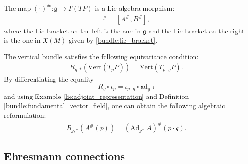 
    \begin{property}
        The map $(\cdot)^\#:\mathfrak{g}\rightarrow\Gamma(TP)$ is a Lie algebra morphism:
        \begin{gather}
            [A,B]^\# = [A^\#,B^\#],
        \end{gather}
        where the Lie bracket on the left is the one in $\mathfrak{g}$ and the Lie bracket on the right is the one in $\mathfrak{X}(M)$ given by \eqref{bundle:lie_bracket}.
    \end{property}

    \begin{property}
        The vertical bundle satisfies the following equivariance condition:
        \begin{gather}
            \label{bundle:vert_g_equivariance}
            R_{g,\ast}(\mathrm{Vert}(T_pP)) = \mathrm{Vert}(T_{p\cdot g}P).
        \end{gather}
        By differentiating the equality \[R_g\circ\iota_p = \iota_{p\cdot g}\circ\mathrm{ad}_{g^{-1}}\] and using Example \ref{lie:adjoint_representation} and Definition \ref{bundle:fundamental_vector_field}, one can obtain the following algebraic reformulation:
        \begin{gather}
            R_{g,\ast}\left(A^\#(p)\right) = \left(\mathrm{Ad}_{g^{-1}}A\right)^\#(p\cdot g).
        \end{gather}
    \end{property}

\subsection{Ehresmann connections}

